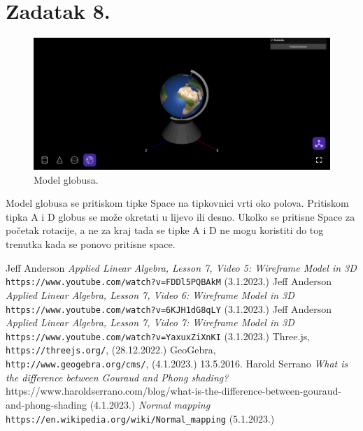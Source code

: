 \documentclass[a4paper,12pt]{article}
\begin{document}
\pagebreak
\section{Zadatak 8.}
\begin{figure}[ht]
    \centering
    \includegraphics[scale=0.5]{image/zadatak8.png}
    \caption{Model globusa.}
\end{figure}
Model globusa se pritiskom tipke Space na tipkovnici vrti oko polova. Pritiskom tipka A i D globus se može okretati u lijevo ili desno. Ukolko se pritisne Space za početak rotacije, 
a ne za kraj tada se tipke A i D ne mogu koristiti do tog trenutka kada se ponovo pritisne space.

\pagebreak

\begin{thebibliography}{9}

 Jeff Anderson \emph{Applied Linear Algebra, Lesson 7, Video 5: Wireframe Model in 3D} \texttt{https://www.youtube.com/watch?v=FDDl5PQBAkM} (3.1.2023.)
 Jeff Anderson \emph{Applied Linear Algebra, Lesson 7, Video 6: Wireframe Model in 3D} \texttt{https://www.youtube.com/watch?v=6KJH1dG8qLY} (3.1.2023.)
 Jeff Anderson \emph{Applied Linear Algebra, Lesson 7, Video 7: Wireframe Model in 3D} \texttt{https://www.youtube.com/watch?v=YaxuxZiXnKI} (3.1.2023.)
 Three.js, \texttt{https://threejs.org/}, (28.12.2022.)
 GeoGebra, \texttt{http://www.geogebra.org/cms/}, (4.1.2023.)
  13.5.2016. Harold Serrano \emph{What is the difference between Gouraud and Phong shading?} https://www.haroldserrano.com/blog/what-is-the-difference-between-gouraud-and-phong-shading (4.1.2023.)
 \emph{Normal mapping} \texttt{https://en.wikipedia.org/wiki/Normal\_mapping} (5.1.2023.)
\end{thebibliography}
\end{document}
